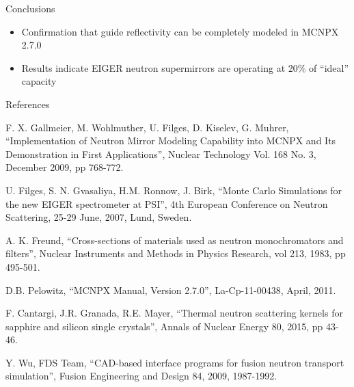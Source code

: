 \documentclass[final,t]{beamer}
\begin{document}
\begin{frame}{}
\begin{columns}[t]
\begin{column}{.3\linewidth}
      \begin{block}{\alert{Conclusions}}
        \begin{itemize}
        \item Confirmation that guide reflectivity can be completely modeled in MCNPX 2.7.0
        \item Results indicate EIGER neutron supermirrors are operating at 20\% of ``ideal'' capacity 
        \end{itemize}
        \vspace{-1ex}
      \end{block}

      \vspace{8ex}



      \begin{block}{References}

      
        \begin{thebibliography}{9}   %
\scriptsize
{}
  F. X. Gallmeier, M. Wohlmuther, U. Filges, D. Kiselev, G. Muhrer,
  ``Implementation of Neutron Mirror Modeling Capability into MCNPX and Its Demonstration in First Applications'',
  Nuclear Technology Vol. 168 No. 3, December 2009, pp 768-772. 

  U. Filges, S. N. Gvasaliya, H.M. Ronnow, J. Birk,
  ``Monte Carlo Simulations for the new EIGER spectrometer at PSI'',
  4th European Conference on Neutron Scattering, 25-29 June, 2007, Lund, Sweden. 

A. K. Freund,
``Cross-sections of materials used as neutron monochromators and filters'',
Nuclear Instruments and Methods in Physics Research, vol 213, 1983, pp 495-501.

   D.B. Pelowitz,
   ``MCNPX Manual, Version 2.7.0'',
   La-Cp-11-00438, April, 2011.

  F. Cantargi, J.R. Granada, R.E. Mayer, 
  ``Thermal neutron scattering kernels for sapphire and silicon single crystals'', 
  Annals of Nuclear Energy 80, 2015, pp 43-46.  

  Y. Wu, FDS Team, 
  ``CAD-based interface programs for fusion neutron transport simulation'', 
  Fusion Engineering and Design 84, 2009, 1987-1992. \\

\end{thebibliography}
      \end{block}


    \end{column}
  \end{columns}



\end{frame}
\end{document}
